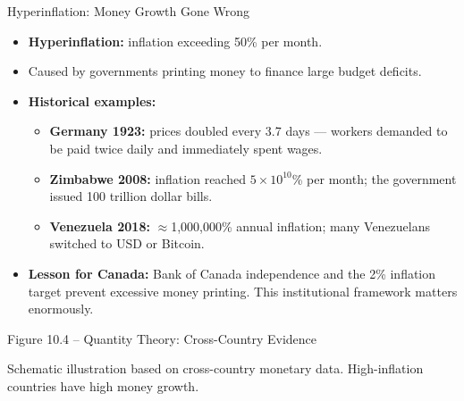 \documentclass[aspectratio=169]{beamer}
\begin{document}
\begin{frame}{Hyperinflation: Money Growth Gone Wrong}
\transfade
\begin{itemize}
  \item \textbf{Hyperinflation:} inflation exceeding \alert{50\% per month}.
  \item Caused by governments printing money to finance large budget deficits.
  \item \textbf{Historical examples:}
  \begin{itemize}
    \item \textbf{Germany 1923:} prices doubled every 3.7 days --- workers demanded to be paid twice daily and immediately spent wages.
    \item \textbf{Zimbabwe 2008:} inflation reached $5 \times 10^{10}$\% per month; the government issued 100 trillion dollar bills.
    \item \textbf{Venezuela 2018:} $\approx$1{,}000{,}000\% annual inflation; many Venezuelans switched to USD or Bitcoin.
  \end{itemize}
  \item \textbf{Lesson for Canada:} Bank of Canada independence and the 2\% inflation target prevent excessive money printing. \textcolor{leafgreen}{This institutional framework matters enormously.}
\end{itemize}
\end{frame}

\begin{frame}{Figure 10.4 -- Quantity Theory: Cross-Country Evidence}
\begin{center}
\end{center}
{\tiny Schematic illustration based on cross-country monetary data. High-inflation countries have high money growth.}
\end{frame}
\end{document}
